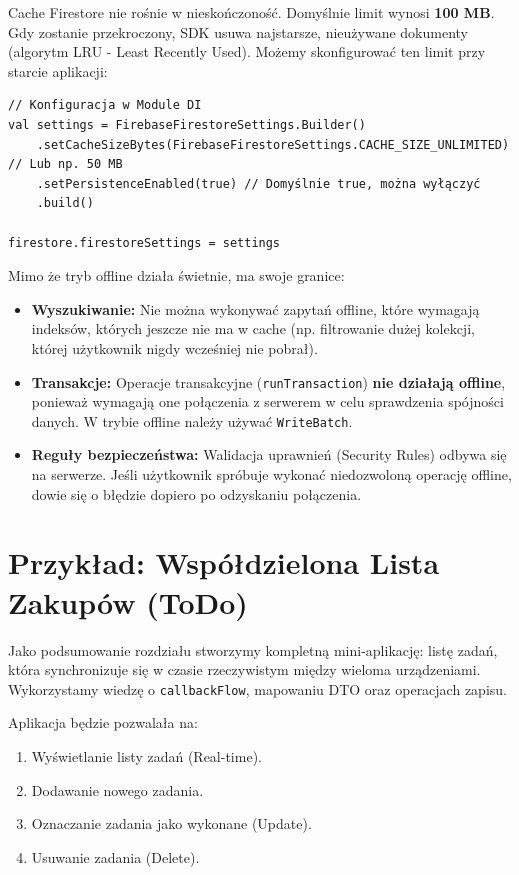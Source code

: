 Cache Firestore nie rośnie w nieskończoność. Domyślnie limit wynosi \textbf{100 MB}. Gdy zostanie przekroczony, SDK usuwa najstarsze, nieużywane dokumenty (algorytm LRU - Least Recently Used). Możemy skonfigurować ten limit przy starcie aplikacji:

\begin{verbatim}
// Konfiguracja w Module DI
val settings = FirebaseFirestoreSettings.Builder()
    .setCacheSizeBytes(FirebaseFirestoreSettings.CACHE_SIZE_UNLIMITED) // Lub np. 50 MB
    .setPersistenceEnabled(true) // Domyślnie true, można wyłączyć
    .build()

firestore.firestoreSettings = settings
\end{verbatim}

Mimo że tryb offline działa świetnie, ma swoje granice:
\begin{itemize}
    \item \textbf{Wyszukiwanie:} Nie można wykonywać zapytań offline, które wymagają indeksów, których jeszcze nie ma w cache (np. filtrowanie dużej kolekcji, której użytkownik nigdy wcześniej nie pobrał).
    \item \textbf{Transakcje:} Operacje transakcyjne (\texttt{runTransaction}) \textbf{nie działają offline}, ponieważ wymagają one połączenia z serwerem w celu sprawdzenia spójności danych. W trybie offline należy używać \texttt{WriteBatch}.
    \item \textbf{Reguły bezpieczeństwa:} Walidacja uprawnień (Security Rules) odbywa się na serwerze. Jeśli użytkownik spróbuje wykonać niedozwoloną operację offline, dowie się o błędzie dopiero po odzyskaniu połączenia.
\end{itemize}

\section{Przykład: Współdzielona Lista Zakupów (ToDo)}

Jako podsumowanie rozdziału stworzymy kompletną mini-aplikację: listę zadań, która synchronizuje się w czasie rzeczywistym między wieloma urządzeniami. Wykorzystamy wiedzę o \texttt{callbackFlow}, mapowaniu DTO oraz operacjach zapisu.

Aplikacja będzie pozwalała na:
\begin{enumerate}
    \item Wyświetlanie listy zadań (Real-time).
    \item Dodawanie nowego zadania.
    \item Oznaczanie zadania jako wykonane (Update).
    \item Usuwanie zadania (Delete).
\end{enumerate}

